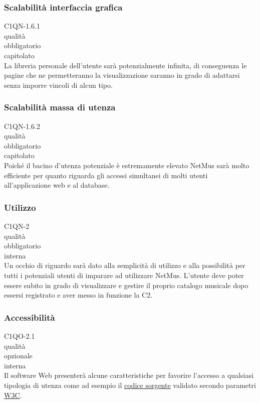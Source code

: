 \subsubsection*{Scalabilit\`a interfaccia grafica}
 C1QN-1.6.1 \\
 qualit\`a \\
 obbligatorio \\
 capitolato \\
La libreria personale dell'utente sar\`a potenzialmente infinita, di conseguenza
le pagine che ne permetteranno la visualizzazione saranno in grado di adattarsi
senza imporre vincoli di alcun tipo.

\subsubsection*{Scalabilit\`a massa di utenza}
 C1QN-1.6.2 \\
 qualit\`a \\
 obbligatorio \\
 capitolato \\
Poich\'e il bacino d'utenza potenziale \`e estremamente elevato NetMus sar\`a molto
efficiente per quanto riguarda gli accessi simultanei di molti utenti
all'applicazione web e al database.

\subsubsection*{Utilizzo}
 C1QN-2 \\
 qualit\`a \\
 obbligatorio \\
 interna \\
Un occhio di riguardo sar\`a dato alla semplicit\`a di utilizzo e alla
possibilit\`a per tutti i potenziali utenti di imparare ad utilizzare NetMus. L'utente
deve poter essere subito in grado di visualizzare e gestire il proprio catalogo
musicale dopo essersi registrato e aver messo in funzione la C2.

\subsubsection*{Accessibilit\`a}
 C1QO-2.1 \\
 qualit\`a \\
 opzionale \\
 interna \\
Il software Web presenter\`a alcune caratteristiche per favorire l'accesso a
qualsiasi tipologia di utenza come ad esempio il \underline{codice sorgente}
validato secondo parametri \underline{W3C}.

